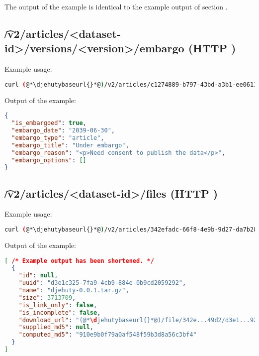   The output of the example is identical to the example output of section
  .

\subsection{\t{/v2/articles/<dataset-id>/versions/<version>/embargo} (HTTP )}

  Example usage:
\begin{lstlisting}[language=bash]
curl (@*\djehutybaseurl{}*@)/v2/articles/c1274889-b797-43bd-a3b1-ee0611d58fd7/versions/2/embargo | jq
\end{lstlisting}

  Output of the example:
\begin{lstlisting}[language=JSON]
{
  "is_embargoed": true,
  "embargo_date": "2039-06-30",
  "embargo_type": "article",
  "embargo_title": "Under embargo",
  "embargo_reason": "<p>Need consent to publish the data</p>",
  "embargo_options": []
}
\end{lstlisting}


\subsection{\t{/v2/articles/<dataset-id>/files} (HTTP )}


  Example usage:
\begin{lstlisting}[language=bash]
curl (@*\djehutybaseurl{}*@)/v2/articles/342efadc-66f8-4e9b-9d27-da7b28b849d2/files
\end{lstlisting}

  Output of the example:
\begin{lstlisting}[language=JSON]
[ /* Example output has been shortened. */
  {
    "id": null,
    "uuid": "d3e1c325-7fa9-4cb9-884e-0b9cd2059292",
    "name": "djehuty-0.0.1.tar.gz",
    "size": 3713709,
    "is_link_only": false,
    "is_incomplete": false,
    "download_url": "(@*\djehutybaseurl{}*@)/file/342e...49d2/d3e1...9292",
    "supplied_md5": null,
    "computed_md5": "910e9b0f79a0af548f59b3d8a56c3bf4"
  }
]
\end{lstlisting}

